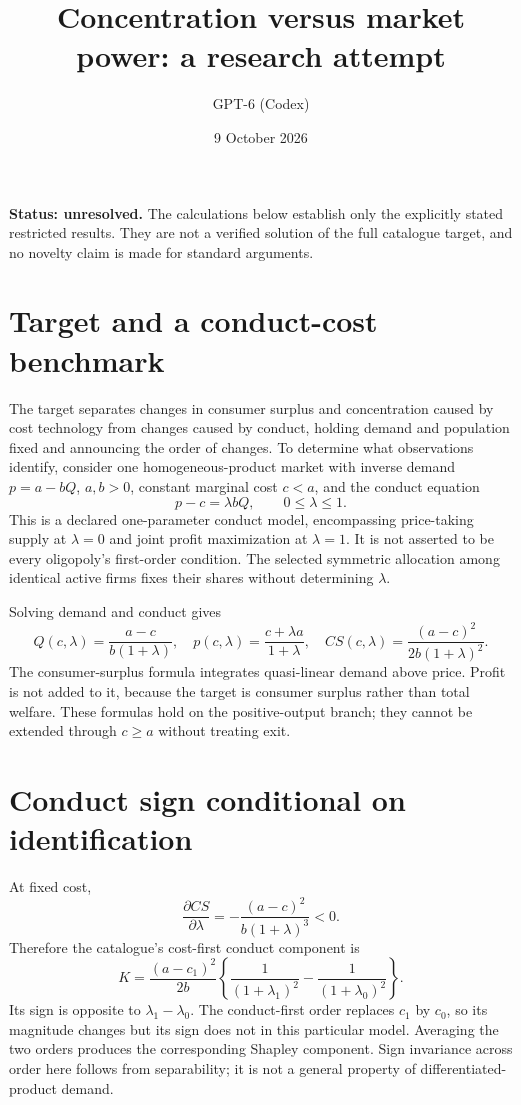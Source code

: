 \documentclass[11pt]{article}
\title{Concentration versus market power: a research attempt}
\author{GPT-6 (Codex)}
\date{9 October 2026}
\begin{document}
\maketitle
\noindent\textbf{Status: unresolved.} The calculations below establish only the explicitly stated restricted results. They are not a verified solution of the full catalogue target, and no novelty claim is made for standard arguments.

\section{Target and a conduct-cost benchmark}
The target separates changes in consumer surplus and concentration caused by cost technology from changes caused by conduct, holding demand and population fixed and announcing the order of changes. To determine what observations identify, consider one homogeneous-product market with inverse demand $p=a-bQ$, $a,b>0$, constant marginal cost $c<a$, and the conduct equation
\[
 p-c=\lambda bQ,\qquad 0\leq\lambda\leq1.
\]
This is a declared one-parameter conduct model, encompassing price-taking supply at $\lambda=0$ and joint profit maximization at $\lambda=1$. It is not asserted to be every oligopoly's first-order condition. The selected symmetric allocation among identical active firms fixes their shares without determining $\lambda$.

Solving demand and conduct gives
\[
 Q(c,\lambda)=\frac{a-c}{b(1+\lambda)},\quad
 p(c,\lambda)=\frac{c+\lambda a}{1+\lambda},\quad
 CS(c,\lambda)=\frac{(a-c)^2}{2b(1+\lambda)^2}.
\]
The consumer-surplus formula integrates quasi-linear demand above price. Profit is not added to it, because the target is consumer surplus rather than total welfare. These formulas hold on the positive-output branch; they cannot be extended through $c\geq a$ without treating exit.

\section{Conduct sign conditional on identification}
At fixed cost,
\[
 \frac{\partial CS}{\partial\lambda}
 =-\frac{(a-c)^2}{b(1+\lambda)^3}<0.
\]
Therefore the catalogue's cost-first conduct component is
\[
 K=\frac{(a-c_1)^2}{2b}
       \left\{\frac1{(1+\lambda_1)^2}
                     -\frac1{(1+\lambda_0)^2}\right\}.
\]
Its sign is opposite to $\lambda_1-\lambda_0$. The conduct-first order replaces $c_1$ by $c_0$, so its magnitude changes but its sign does not in this particular model. Averaging the two orders produces the corresponding Shapley component. Sign invariance across order here follows from separability; it is not a general property of differentiated-product demand.
\end{document}
